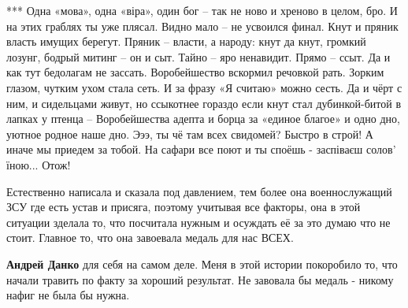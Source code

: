 \begin{itemize}
\begin{itemize}
 
***
\obeycr
Одна «мова», одна «віра», один бог –
так не ново и хреново в целом, бро.
И на этих граблях ты уже плясал.
Видно мало – не усвоился финал.
Кнут и пряник власть имущих берегут.
Пряник – власти, а народу: кнут да кнут,
громкий лозунг, бодрый митинг – он и сыт.
Тайно – яро ненавидит. Прямо – ссыт.
Да и как тут бедолагам не зассать.
Воробейшество вскормил речовкой рать.
Зорким глазом, чутким ухом стала сеть.
И за фразу «Я считаю» можно сесть.
Да и чёрт с ним, и сидельцами живут,
но ссыкотнее гораздо если кнут
стал дубинкой-битой в лапках у птенца –
Воробейшества адепта и борца
за «единое благое» и одно
дно, уютное родное наше дно.
Эээ, ты чё там всех свидомей? Быстро в строй!
А иначе мы приедем за тобой.
На сафари все поют и ты споёшь -
заспіваєш солов’ їною... Отож!
\restorecr
\end{itemize}

 

Естественно написала и сказала под давлением, тем более она военнослужащий ЗСУ
где есть устав и присяга, поэтому учитывая все факторы, она в этой ситуации
зделала то, что посчитала нужным и осуждать её за это думаю что не стоит.
Главное то, что она завоевала медаль для нас ВСЕХ.

\begin{itemize}
 
\textbf{Андрей Данко} для себя на самом деле. Меня в этой истории покоробило
то, что начали травить по факту за хороший результат. Не завовала бы медаль -
никому нафиг не была бы нужна.
\end{itemize}

 

\end{itemize}
